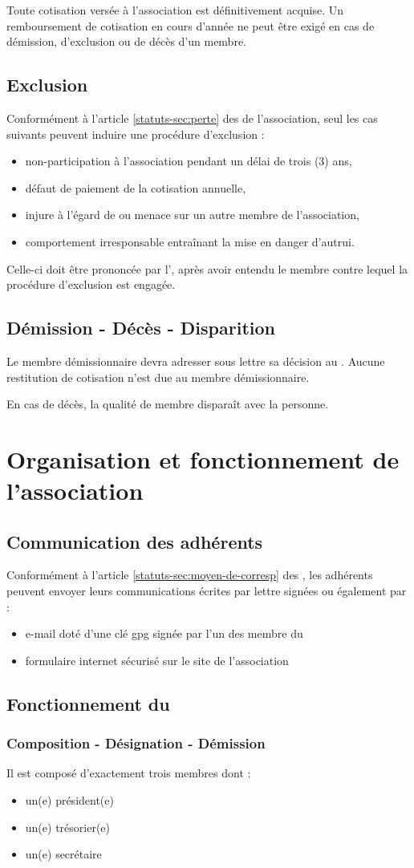 \documentclass[a4paper,french,10pt]{article}
\newcommand{\article}[1]{\subsection{#1}\addtocounter{article}{1}}
\newcounter{article}
\newcommand{\artrefst}[1]{article \ref{statuts-#1} des \statuts{}}
\begin{document}
Toute cotisation versée à l'association est définitivement acquise. Un remboursement de cotisation en cours d'année ne peut être exigé en cas de démission, d'exclusion ou de décès d'un membre.

\article{Exclusion}
\label{sec:exclusion}

Conformément à l'\artrefst{sec:perte} de l'association, seul les cas suivants  peuvent induire une procédure d'exclusion :
\begin{itemize}
\item non-participation à l'association pendant un délai de trois (3) ans,
\item défaut de paiement de la cotisation annuelle,
\item injure à l'égard de ou menace sur un autre membre de l'association,
\item comportement irresponsable entraînant la mise en danger d'autrui.
\end{itemize}

Celle-ci doit être prononcée par l'\AG{}, après avoir entendu le membre contre lequel la procédure d'exclusion est engagée.

\article{Démission - Décès - Disparition}
\label{sec:demiss-deces-disp}
Le membre démissionnaire devra adresser sous lettre sa décision au \bureau{}.
Aucune restitution de cotisation n'est due au membre démissionnaire.

En cas de décès, la qualité de membre disparaît avec la personne.

\section{Organisation et fonctionnement de l'association}

\article{Communication des adhérents}
\label{sec:comm-des-adher}

Conformément à l'\artrefst{sec:moyen-de-corresp}, les adhérents peuvent envoyer leurs communications écrites par lettre signées ou également par :
\begin{itemize}
\item e-mail doté d'une clé gpg signée par l'un des membre du \bureau{}
\item formulaire internet sécurisé sur le site de l'association
\end{itemize}


\article{Fonctionnement du \bureau{}}
\label{sec:fonct-du-bure}

\subsubsection*{Composition - Désignation - Démission}
\label{sec:comp-design}
Il est composé d'exactement trois membres dont :
\begin{itemize}
\item un(e) président(e)
\item un(e) trésorier(e)
\item un(e) secrétaire
\end{itemize}
\end{document}
